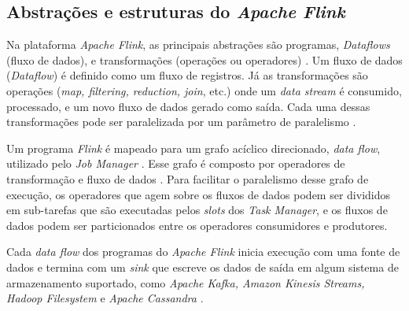 
\newcommand{\flink}{\emph{Apache Flink}\xspace}

\subsection{Abstrações e estruturas do \flink}

Na plataforma \flink, as principais abstrações são programas, \emph{Dataflows}
(fluxo de dados), e transformações (operações ou operadores)
\cite{Carbone2015,ApacheFLinkDataFlow}.
Um fluxo de dados (\emph{Dataflow}) é definido como um fluxo de registros.
Já as transformações são operações (\emph{map, filtering, reduction, join},
etc.) onde um \emph{data stream} é consumido, processado, e um novo
fluxo de dados gerado como saída.
Cada uma dessas transformações pode ser paralelizada por um parâmetro de
paralelismo \cite{ApacheFlink2020}.

Um programa \emph{Flink} é mapeado para um grafo acíclico direcionado, \emph{data
flow}, utilizado pelo \emph{Job Manager} \cite{Carbone2015}.
Esse grafo é composto por operadores de transformação e fluxo de dados
\cite{ApacheFlink2020}.
Para facilitar o paralelismo desse grafo de execução, os operadores que agem
sobre os fluxos de dados podem ser divididos em sub-tarefas que são executadas
pelos \emph{slots} dos \emph{Task Manager}, e os fluxos de dados podem ser
particionados entre os operadores consumidores e produtores.

Cada \emph{data flow} dos programas do \emph{Apache Flink} inicia execução com uma fonte
de dados e termina com um \emph{sink} que escreve os dados de saída em algum
sistema de armazenamento suportado, como \emph{Apache Kafka, Amazon Kinesis Streams,
Hadoop Filesystem} e \emph{Apache Cassandra} \cite{ApacheFlink2020}.

